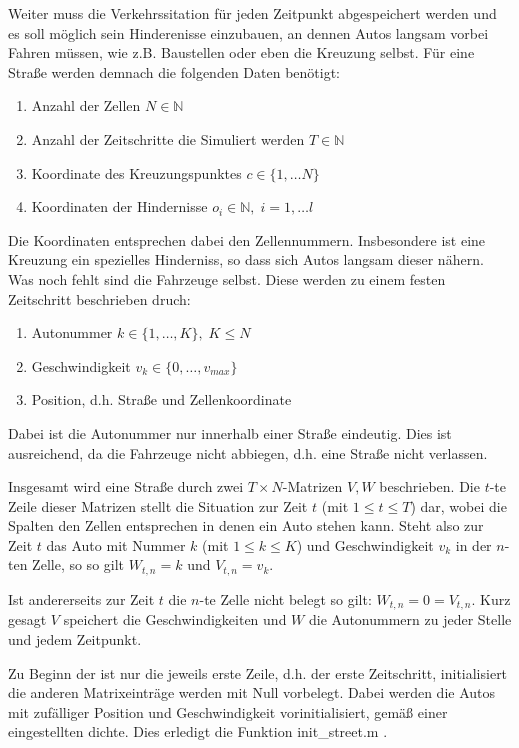 Weiter muss die Verkehrssitation für jeden Zeitpunkt abgespeichert werden und
es soll möglich sein Hinderenisse einzubauen, an dennen Autos langsam vorbei Fahren müssen, 
wie z.B. Baustellen oder eben die Kreuzung selbst. 
Für eine Straße werden demnach die folgenden Daten benötigt:
\begin{enumerate}
  \item Anzahl der Zellen \(N \in \mathbb{N}\)
  \item Anzahl der Zeitschritte die Simuliert werden \(T \in \mathbb{N}\)
  \item Koordinate des Kreuzungspunktes \(c \in \{ 1, \ldots N \}\)
  \item Koordinaten der Hindernisse \(o_i \in \mathbb{N}, \; i = 1, \ldots l\)
\end{enumerate}
Die Koordinaten entsprechen dabei den Zellennummern. Insbesondere ist eine Kreuzung ein spezielles Hinderniss,
so dass sich Autos langsam dieser nähern. 
Was noch fehlt sind die Fahrzeuge selbst. Diese werden zu einem festen Zeitschritt beschrieben druch:
\begin{enumerate}
  \item Autonummer \(k \in \{ 1, \ldots, K \}, \; K \leq N\) 
  \item Geschwindigkeit \(v_k \in \{0, \ldots, v_{max} \}\)
  \item Position, d.h. Straße und Zellenkoordinate
\end{enumerate}
Dabei ist die Autonummer nur innerhalb einer Straße eindeutig. Dies ist ausreichend, da die Fahrzeuge nicht 
abbiegen, d.h. eine Straße nicht verlassen.

Insgesamt wird eine Straße durch zwei \(T \times N\)-Matrizen \(V, W\) beschrieben.
Die \(t\)-te Zeile dieser Matrizen stellt die Situation zur Zeit \(t\) (mit \(1 \leq t \leq T\)) dar, 
wobei die Spalten den Zellen entsprechen in denen ein Auto stehen kann. 
Steht also zur Zeit \(t\) das Auto mit Nummer \(k\) (mit \(1 \leq k \leq K\)) und Geschwindigkeit \(v_k\) in der \(n\)-ten Zelle, 
so so gilt \( W_{t, n} = k\) und \(V_{t, n} = v_k\). 

Ist andererseits zur Zeit \(t\) die \(n\)-te Zelle nicht belegt so gilt: \(W_{t, n} = 0 = V_{t, n}\).
Kurz gesagt \(V\) speichert die Geschwindigkeiten und \(W\) die Autonummern zu jeder Stelle und jedem Zeitpunkt.

Zu Beginn der ist nur die jeweils erste Zeile, d.h. der erste Zeitschritt, initialisiert die anderen Matrixeinträge
werden mit Null vorbelegt. Dabei werden die Autos mit zufälliger Position und Geschwindigkeit vorinitialisiert, gemäß
einer eingestellten dichte. Dies erledigt die Funktion init\_street.m .
